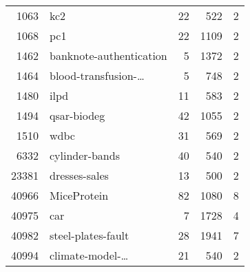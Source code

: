 \begin{tabular}{rlrrr}
 1063 &                              kc2 &                22 &                522 &                2 \\
 1068 &                              pc1 &                22 &               1109 &                2 \\
 1462 &          banknote-authentication &                 5 &               1372 &                2 \\
 1464 & blood-transfusion-\dots &                 5 &                748 &                2 \\
 1480 &                             ilpd &                11 &                583 &                2 \\
 1494 &                      qsar-biodeg &                42 &               1055 &                2 \\
 1510 &                             wdbc &                31 &                569 &                2 \\
 6332 &                   cylinder-bands &                40 &                540 &                2 \\
23381 &                    dresses-sales &                13 &                500 &                2 \\
40966 &                      MiceProtein &                82 &               1080 &                8 \\
40975 &                              car &                 7 &               1728 &                4 \\
40982 &               steel-plates-fault &                28 &               1941 &                7 \\
40994 & climate-model-\dots &                21 &                540 &                2 \\
\bottomrule
\end{tabular}
